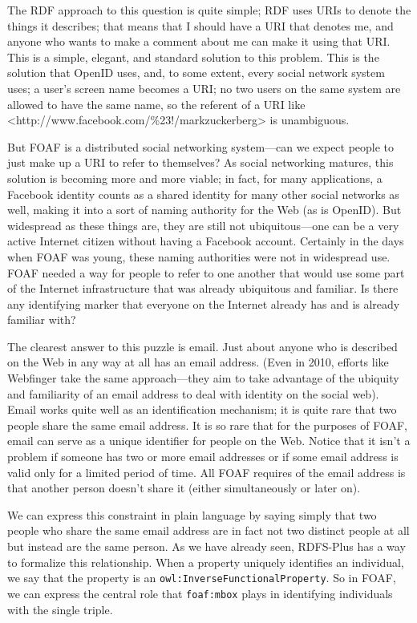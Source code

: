 The RDF approach to this question is quite simple; RDF uses URIs to
denote the things it describes; that means that I should have a URI that
denotes me, and anyone who wants to make a comment about me can make it
using that URI. This is a simple, elegant, and standard solution to this
problem. This is the solution that OpenID uses, and, to some extent,
every social network system uses; a user's screen name becomes a URI; no
two users on the same system are allowed to have the same name, so the
referent of a URI like
\textless{}http://www.facebook.com/\%23!/markzuckerberg\textgreater{}
is unambiguous.

But FOAF is a distributed social networking system---can we expect
people to just make up a URI to refer to themselves? As social
networking matures, this solution is becoming more and more viable; in
fact, for many applications, a Facebook identity counts as a shared
identity for many other social networks as well, making it into a sort
of naming authority for the Web (as is OpenID). But widespread as these
things are, they are still not ubiquitous---one can be a very active
Internet citizen without having a Facebook account. Certainly in the
days when FOAF was young, these naming authorities were not in
widespread use. FOAF needed a way for people to refer to one another
that would use some part of the Internet infrastructure that was already
ubiquitous and familiar. Is there any identifying marker that everyone
on the Internet already has and is already familiar with?

The clearest answer to this puzzle is email. Just about anyone who is
described on the Web in any way at all has an email address. (Even in
2010, efforts like Webfinger take the same approach---they aim to take
advantage of the ubiquity and familiarity of an email address to deal
with identity on the social web). Email works quite well as an
identification mechanism; it is quite rare that two people share the
same email address. It is so rare that for the purposes of FOAF, email
can serve as a unique identifier for people on the Web. Notice that it
isn't a problem if someone has two or more email addresses or if some
email address is valid only for a limited period of time. All FOAF
requires of the email address is that another person doesn't share it
(either simultaneously or later on).

We can express this constraint in plain language by saying simply that
two people who share the same email address are in fact not two distinct
people at all but instead are the same person. As we have already seen,
RDFS-Plus has a way to formalize this relationship. When a property
uniquely identifies an individual, we say that the property is an
\texttt{owl:InverseFunctionalProperty}. So in FOAF, we can express the central
role that \texttt{foaf:mbox} plays in identifying individuals with the single
triple.

